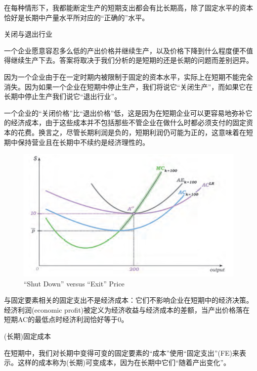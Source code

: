 \documentclass{article}
\begin{document}
在每种情形下，我都能断定生产的短期支出都会有比长期高，除了固定水平的资本恰好是长期中产量水平所对应的“正确的”水平。

\hspace*{\fill}

关闭与退出行业

一个企业愿意容忍多么低的产出价格并继续生产，以及价格下降到什么程度便不值得继续生产下去。答案将取决于我们分析的是短期的还是长期的问题而差别迥异。

因为一个企业由于在一定时期内被限制于固定的资本水平，实际上在短期不能完全消失。因为如果一个企业在短期中停止生产，我们将说它“关闭生产”，而如果它在长期中停止生产我们说它“退出行业”。

一个企业的“关闭价格”比“退出价格”低，这是因为在短期企业可以更容易地弥补它的经济成本，由于这些成本并不包括那些不管企业在做什么时都必须支付的固定资本的花费。换言之，尽管长期利润是负的，短期利润仍可能为正的，这意味着在短期中保持营业且在长期中不续约是经济理性的。

\begin{figure}[H] %
	\centering %
	\includegraphics[width=1\textwidth]{13_2} %
	\caption{“Shut Down” versus “Exit” Price} %
	\label{Fig.main3} %
\end{figure}

与固定要素相关的固定支出不是经济成本：它们不影响企业在短期中的经济决策。经济利润(economic profit)被定义为经济收益与经济成本的差额，当产出价格落在短期AC的最低点时经济利润恰好等于0。

\hspace*{\fill}

(长期)固定成本

在短期中，我们对长期中变得可变的固定要素的“成本”使用“固定支出”(FE)来表示。这样的成本称为(长期)可变成本，因为在长期中它们“随着产出变化”。
\end{document}
